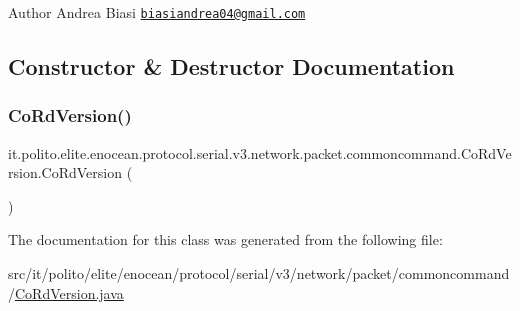 \begin{DoxyAuthor}{Author}
Andrea Biasi \href{mailto:biasiandrea04@gmail.com}{\tt biasiandrea04@gmail.\+com} 
\end{DoxyAuthor}


\subsection{Constructor \& Destructor Documentation}
\hypertarget{classit_1_1polito_1_1elite_1_1enocean_1_1protocol_1_1serial_1_1v3_1_1network_1_1packet_1_1commoncommand_1_1_co_rd_version_af4c5b80dba48ccad7e6f94b674a11a87}{}\label{classit_1_1polito_1_1elite_1_1enocean_1_1protocol_1_1serial_1_1v3_1_1network_1_1packet_1_1commoncommand_1_1_co_rd_version_af4c5b80dba48ccad7e6f94b674a11a87} 
\subsubsection{\texorpdfstring{Co\+Rd\+Version()}{CoRdVersion()}}
{\footnotesize\ttfamily it.\+polito.\+elite.\+enocean.\+protocol.\+serial.\+v3.\+network.\+packet.\+commoncommand.\+Co\+Rd\+Version.\+Co\+Rd\+Version (\begin{DoxyParamCaption}{ }\end{DoxyParamCaption})}



The documentation for this class was generated from the following file\+:\begin{DoxyCompactItemize}
\item 
src/it/polito/elite/enocean/protocol/serial/v3/network/packet/commoncommand/\hyperlink{_co_rd_version_8java}{Co\+Rd\+Version.\+java}\end{DoxyCompactItemize}
